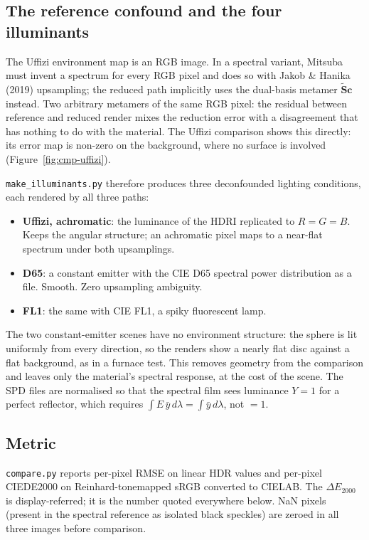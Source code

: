 \documentclass[11pt,a4paper]{article}
\newcommand{\mSd}{\tilde{\mathbf{S}}}
\newcommand{\vc}{\mathbf{c}}
\newcommand{\lam}{\lambda}
\newcommand{\dE}{\Delta E_{2000}}
\newcommand{\file}[1]{\texttt{#1}}
\begin{document}
\subsection{The reference confound and the four illuminants}
\label{sec:confound}

The Uffizi environment map is an RGB image.  In a spectral variant, Mitsuba
must invent a spectrum for every RGB pixel and does so with Jakob \& Hanika
(2019) upsampling; the reduced path implicitly uses the dual-basis metamer
$\mSd\vc$ instead.  Two arbitrary metamers of the same RGB pixel: the residual
between reference and reduced render mixes the reduction error with a
disagreement that has nothing to do with the material.  The Uffizi comparison
shows this directly: its error map is non-zero on the background, where no
surface is involved (Figure~\ref{fig:cmp-uffizi}).

\file{make\_illuminants.py} therefore produces three deconfounded lighting
conditions, each rendered by all three paths:
\begin{itemize}[nosep]
  \item \textbf{Uffizi, achromatic}: the luminance of the HDRI replicated to
        $R{=}G{=}B$.  Keeps the angular structure; an achromatic pixel maps to
        a near-flat spectrum under both upsamplings.
  \item \textbf{D65}: a constant emitter with the CIE D65 spectral power
        distribution as a file.  Smooth.  Zero upsampling ambiguity.
  \item \textbf{FL1}: the same with CIE FL1, a spiky fluorescent lamp.
\end{itemize}
The two constant-emitter scenes have no environment structure: the sphere is
lit uniformly from every direction, so the renders show a nearly flat disc
against a flat background, as in a furnace test.  This removes geometry from
the comparison and leaves only the material's spectral response, at the cost
of the scene.
The SPD files are normalised so that the spectral film sees luminance $Y=1$
for a perfect reflector, which requires $\int E\,\bar y\,d\lam=\int\bar y\,d\lam$,
not $=1$.

\subsection{Metric}

\file{compare.py} reports per-pixel RMSE on linear HDR values and per-pixel
CIEDE2000 on Reinhard-tonemapped sRGB converted to CIELAB.  The $\dE$ is
display-referred; it is the number quoted everywhere below.  NaN pixels
(present in the spectral reference as isolated black speckles) are zeroed in
all three images before comparison.
\end{document}
